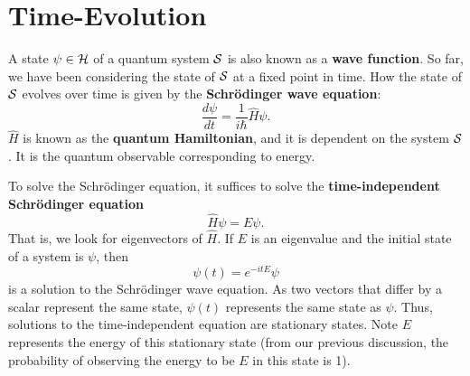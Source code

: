 \section{Time-Evolution}
A state $\psi \in {\mathcal H}$ of a quantum system ${\mathcal S}$ is also known as a \textbf{wave function}. So far, we have been considering the state of ${\mathcal S}$ at a fixed point in time. How the state of ${\mathcal S}$ evolves over time is given by the \textbf{Schr\"{o}dinger wave equation}:
\[
    \frac{d\psi}{dt} = \frac{1}{i\hbar}\hat{H}\psi.
\]
$\hat{H}$ is known as the \textbf{quantum Hamiltonian}, and it is dependent on the system ${\mathcal S}$. It is the quantum observable corresponding to energy.

To solve the Schr\"{o}dinger equation, it suffices to solve the \textbf{time-independent Schr\"{o}dinger equation}
\[
    \hat{H}\psi = E\psi.
\]
That is, we look for eigenvectors of $\hat{H}$. If $E$ is an eigenvalue and the initial state of a system is $\psi$, then
\[
    \psi(t) = e^{-itE}\psi
\]
is a solution to the Schr\"{o}dinger wave equation. As two vectors that differ by a scalar represent the same state, $\psi(t)$ represents the same state as $\psi$. Thus, solutions to the time-independent equation are stationary states. Note $E$ represents the energy of this stationary state (from our previous discussion, the probability of observing the energy to be $E$ in this state is 1).

